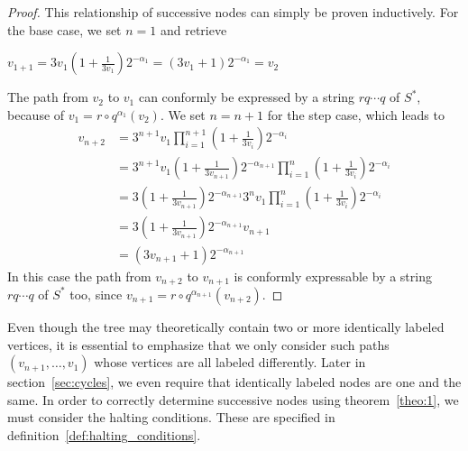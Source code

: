 \begin{proof}
	\label{proof:1}
	This relationship of successive nodes can simply be proven inductively. For the base case, we set $n=1$ and retrieve
	\begin{center}
		$v_{1+1}=3v_1\left(1+\frac{1}{3v_1}\right)2^{-\alpha_1}
		=\left(3v_1+1\right)2^{-\alpha_1}=v_2$
	\end{center}
	The path from $v_2$ to $v_1$ can conformly be expressed by a string $rq\cdots q$ of $S^\ast$, because of $v_1=r\circ q^{\alpha_1}\left(v_2\right)$. We set $n=n+1$ for the step case, which leads to
	\begin{equation*}
	\begin{array}{cl}
	v_{n+2} &
	=3^{n+1}v_1\prod_{i=1}^{n+1}\left(1+\frac{1}{3v_i}\right)2^{-\alpha_i}\\
	&
	=3^{n+1}v_1\left(1+\frac{1}{3v_{n+1}}\right)2^{-\alpha_{n+1}}\prod_{i=1}^{n}\left(1+\frac{1}{3v_i}\right)2^{-\alpha_i}\\
	&
	=3\left(1+\frac{1}{3v_{n+1}}\right)2^{-\alpha_{n+1}}3^nv_1\prod_{i=1}^{n}\left(1+\frac{1}{3v_i}\right)2^{-\alpha_i}\\
	&
	=3\left(1+\frac{1}{3v_{n+1}}\right)2^{-\alpha_{n+1}}v_{n+1}\\
	&
	=\left(3v_{n+1}+1\right)2^{-\alpha_{n+1}}
	\end{array}
	\end{equation*}
	In this case the path from $v_{n+2}$ to $v_{n+1}$ is conformly 
	expressable by a string $rq\cdots q$ of $S^\ast$ too, since
	$v_{n+1}=r\circ q^{\alpha_{n+1}}\left(v_{n+2}\right)$.
\end{proof}

Even though the tree may theoretically contain two or more identically labeled vertices, it is essential to emphasize that we only consider such paths $(v_{n+1},\ldots,v_1)$ whose vertices are all labeled differently. Later in section~\ref{sec:cycles}, we even require that identically labeled nodes are one and the same. In order to correctly determine successive nodes using theorem~\ref{theo:1}, we must consider the halting conditions. These are specified in definition~\ref{def:halting_conditions}.

